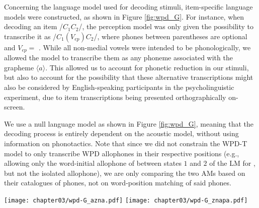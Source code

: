 {%
Concerning the language model used for decoding stimuli, item-specific language models were constructed, as shown in Figure \ref{fig:wpd_G}. For instance, when decoding an item /$C_{1}C_{2}$/, the perception model was only given the possibility to transcribe it as /$C_{1}(V_{ep})C_{2}$/, where phones between parentheses are optional and $V_{ep} = $ \textipa{[@]}. %
While all non-medial vowels were intended to be  phonologically, we allowed the model to transcribe them as any phoneme associated with the grapheme $\langle a \rangle$. This allowed us to account for phonetic reduction in our stimuli, but also to account for the possibility that these alternative transcriptions might also be considered by English-speaking participants in the psycholinguistic experiment, due to item transcriptions being presented orthographically on-screen.

We use a null language model as shown in Figure \ref{fig:wpd_G}, meaning that the decoding process is entirely dependent on the acoustic model, without using information on phonotactics. Note that since we did not constrain the WPD-T model to only transcribe WPD allophones in their respective positions (e.g., allowing only the word-initial allophone of  between states $1$ and $2$ of the LM for , but not the isolated  allophone), we are only comparing the two AMs based on their catalogues of phones, not on word-position matching of said phones.   

\begin{figure*}[htb]
\centering
\texttt{[image: chapter03/wpd-G\_azna.pdf]}
\vspace{0.5cm}
\texttt{[image: chapter03/wpd-G\_znapa.pdf]}
\caption{Constrained language model used to during decoding (here: LMs for  (top) and  (bottom) trials). Nodes in the graph represent states, edges represent transitions between states (here: phonemes, transcribed in WSJ notation). Models were given the choice to transcribe the phoneme  with any of the phonemes linked to the grapheme $\langle a \rangle$, as English listeners might have also done so during the task. The LMs are ``null'', as they only constrain the possible decoding outputs without assigning higher or lower probabilities to certain edges. The optimal decoding path is therefore only dependent on the acoustic scores.}
\label{fig:wpd_G}
\end{figure*}

}
